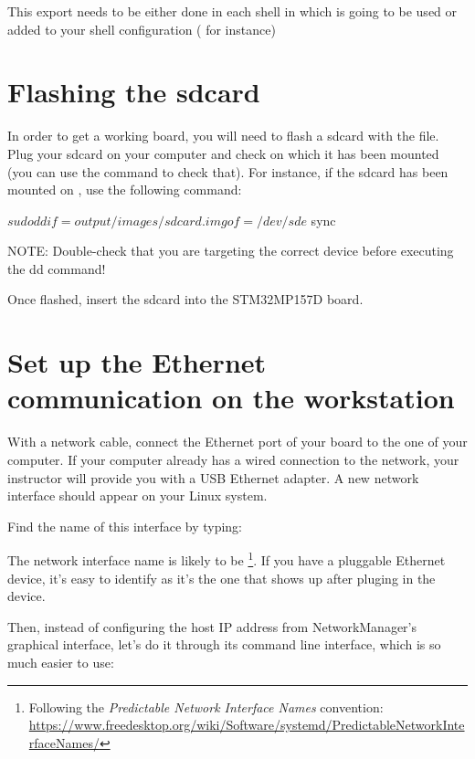 This export needs to be either done in each shell in which  is
going to be used or added to your shell configuration ( for
instance)

\section{Flashing the sdcard}

In order to get a working board, you will need to flash a sdcard with the 
 file. Plug your sdcard on your computer and
check on which  it has been mounted (you can use the 
command to check that). For instance, if the sdcard has been mounted on
, use the following command:

\begin{bashinput}
$ sudo dd if=output/images/sdcard.img of=/dev/sde
$ sync
\end{bashinput}

NOTE: Double-check that you are targeting the correct device before executing
the dd command!

Once flashed, insert the sdcard into the STM32MP157D board.



\section{Set up the Ethernet communication on the workstation}

With a network cable, connect the Ethernet port of your board to the
one of your computer. If your computer already has a wired connection
to the network, your instructor will provide you with a USB Ethernet
adapter. A new network interface should appear on your Linux system.

Find the name of this interface by typing:

The network interface name is likely to be
\footnote{Following the {\em Predictable Network Interface
Names} convention:
\url{https://www.freedesktop.org/wiki/Software/systemd/PredictableNetworkInterfaceNames/}}.
If you have a pluggable Ethernet device, it's easy to identify as it's
the one that shows up after pluging in the device.

Then, instead of configuring the host IP address from NetworkManager’s graphical interface,
let’s do it through its command line interface, which is so much easier to use:

